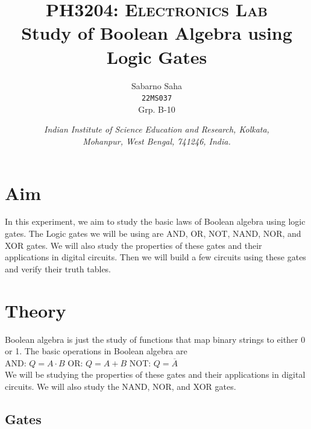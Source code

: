 \documentclass{scrartcl}
\title{
        \Large\textsc{PH3204: Electronics Lab} \\
        \vspace{10pt}
        \Huge \textbf{Study of Boolean Algebra using Logic Gates} \\
}
\author{Sabarno Saha \\ \texttt{22MS037} \\ Grp. B-10}
\date{\normalsize
        \textit{Indian Institute of Science Education and Research, Kolkata, \\
        Mohanpur, West Bengal, 741246, India.}
}
\newcommand{\1}{\mathbbm{1}}
\begin{document}
\maketitle
\tableofcontents
\section{Aim}
In this experiment, we aim to study the basic laws of Boolean algebra using logic gates. The Logic gates we will be using are
AND, OR, NOT, NAND, NOR, and XOR gates. We will also study the properties of these gates and their applications in digital circuits. Then 
we will build a few circuits using these gates and verify their truth tables.
\section{Theory}
Boolean algebra is just the study of functions that map binary strings to either 0 or 1. The basic operations in Boolean algebra are \\
    AND: $Q = A \cdot B$ \hfill 
    OR: $Q = A + B$ \hfill 
    NOT: $Q = \overline{A}$ \\
We will be studying the properties of these gates and their applications in digital circuits. We will also study the NAND, NOR, and XOR gates.
\subsection{Gates}
\end{document}
